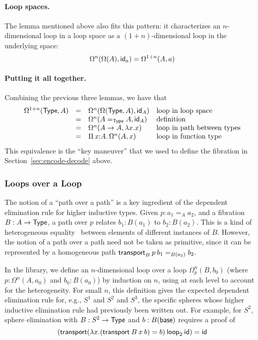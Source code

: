 \paragraph{Loop spaces.}

The  lemma mentioned above also fits this pattern: it
characterizes an $n$-dimensional loop in a loop space as a
$(1+n)$-dimensional loop in the underlying space:
\[
\Omega^n(\Omega(A),\mathsf{id}_a) = \Omega^{1+n}(A,a)
\]

\paragraph{Putting it all together.}  Combining the previous three
lemmas, we have that
\[
\begin{array}{rcll}
\Omega^{1+n}(\mathsf{Type},A) & = & 
      \Omega^n(\Omega(\mathsf{Type},A) , \mathsf{id}_A) & \text{loop in loop space} \\
& = & \Omega^n(A =_{\mathsf{Type}} A , \mathsf{id}_A) & \text{definition} \\
& = & \Omega^n(A \to A , \lambda x.x) & \text{loop in path between types}\\
& = & \textnormal{$\Pi$}\,\mathit{x} \mathit{:} \mathit{A}.\,\mathit{} \Omega^n(A, x) & \text{loop in function type}\\
\end{array}
\]
This equivalence is the ``key maneuver'' that we used to define the 
fibration in Section~\ref{sec:encode-decode} above.  

\subsubsection{Loops over a Loop}

The notion of a ``path over a path'' is a key ingredient of the
dependent elimination rule for higher inductive types.  Given $p : a_1
=_A a_2$, and a fibration $B : A \to \mathsf{Type}$, a path over $p$ relates
$b_1 : B(a_1)$ to $b_2 : B(a_2)$.  This is a kind of heterogeneous
equality~\citep{mcbride00thesis} between elements of different instances
of $B$.  However, the notion of a path over a path need not be taken as
primitive, since it can be represented by a homogeneous path
$\mathsf{transport}_B \: p \: b_1 =_{B(a_2)} b_2$.  

In the library, we define an $n$-dimensional loop over a loop
$\Omega^n_p(B,b_0)$ (where $p : \Omega^n(A,a_0)$ and $b_0 : B(a_0)$) by
induction on $n$, using  at each level to account for the
heterogeneity.  For small $n$, this definition gives the expected
dependent elimination rule for, e.g., $S^1$ and $S^2$ and $S^3$, the
specific spheres whose higher inductive elimination rule had previously been written out.  For example, for
$S^2$, sphere elimination with $B : S^2 \to \mathsf{Type}$ and $b :
B(\mathsf{base})$ requires a proof of 
\[
(\mathsf{transport} (\lambda x. (\mathsf{transport} \: B \: x \: b) = b) \: \mathsf{loop}_2 \: \mathsf{id}) = \mathsf{id}
\]

